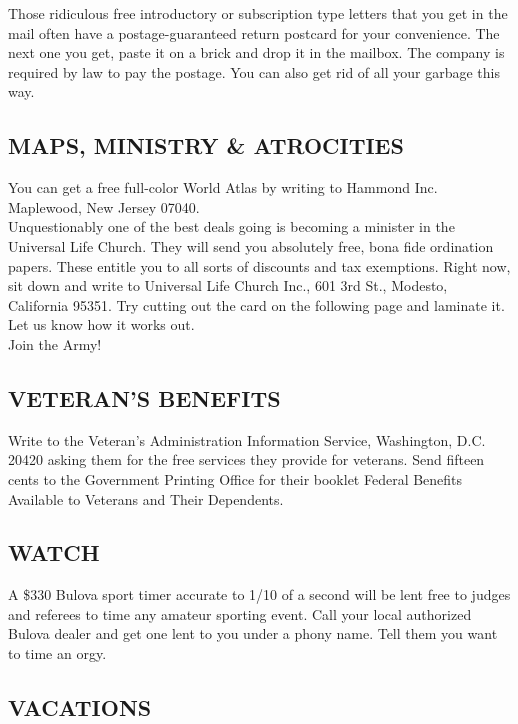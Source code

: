 \documentclass[11pt,twoside,a4paper]{book}
\begin{document}
Those ridiculous free introductory or subscription type letters that you get in the mail often have a postage-guaranteed return postcard for your convenience. The next one you get, paste it on a brick and drop it in the mailbox. The company is required by law to pay the postage. You can also get rid of all your garbage this way.~\\

\subsection{MAPS, MINISTRY \& ATROCITIES}

You can get a free full-color World Atlas by writing to Hammond Inc. Maplewood, New Jersey 07040.~\\

Unquestionably one of the best deals going is becoming a minister in the Universal Life Church. They will send you absolutely free, bona fide ordination papers. These entitle you to all sorts of discounts and tax exemptions. Right now, sit down and write to Universal Life Church Inc., 601 3rd St., Modesto, California 95351. Try cutting out the card on the following page and laminate it. Let us know how it works out.~\\

Join the Army!

\subsection{VETERAN'S BENEFITS}
	Write to the Veteran's Administration Information Service, Washington, D.C. 20420 asking them for the free services they provide for veterans. Send fifteen cents to the Government Printing Office for their booklet Federal Benefits Available to Veterans and Their Dependents.~\\

\subsection{WATCH} 

A \$330 Bulova sport timer accurate to 1/10 of a second will be lent free to judges and referees to time any amateur sporting event. Call your local authorized Bulova dealer and get one lent to you under a phony name. Tell them you want to time an orgy.~\\

\subsection{VACATIONS}
\end{document}

